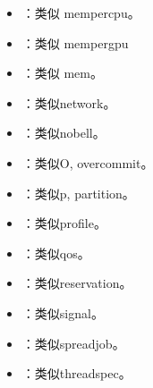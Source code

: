 \documentclass[a4paper,12pt,english]{sphinxmanual}
\begin{document}
\begin{itemize}
\item {} 
\sphinxAtStartPar
{}：类似 \sphinxhyphen{}\sphinxhyphen{}mem\sphinxhyphen{}per\sphinxhyphen{}cpu。

\item {} 
\sphinxAtStartPar
{}：类似 \sphinxhyphen{}\sphinxhyphen{}mem\sphinxhyphen{}per\sphinxhyphen{}gpu

\item {} 
\sphinxAtStartPar
{}：类似 \sphinxhyphen{}\sphinxhyphen{}mem。

\item {} 
\sphinxAtStartPar
{}：类似\sphinxhyphen{}\sphinxhyphen{}network。

\item {} 
\sphinxAtStartPar
{}：类似\sphinxhyphen{}\sphinxhyphen{}no\sphinxhyphen{}bell。

\item {} 
\sphinxAtStartPar
{}：类似\sphinxhyphen{}O, \sphinxhyphen{}\sphinxhyphen{}overcommit。

\item {} 
\sphinxAtStartPar
{}：类似\sphinxhyphen{}p, \sphinxhyphen{}\sphinxhyphen{}partition。

\item {} 
\sphinxAtStartPar
{}：类似\sphinxhyphen{}\sphinxhyphen{}profile。

\item {} 
\sphinxAtStartPar
{}：类似\sphinxhyphen{}\sphinxhyphen{}qos。

\item {} 
\sphinxAtStartPar
{}：类似\sphinxhyphen{}\sphinxhyphen{}reservation。

\item {} 
\sphinxAtStartPar
{}：类似\sphinxhyphen{}\sphinxhyphen{}signal。

\item {} 
\sphinxAtStartPar
{}：类似\sphinxhyphen{}\sphinxhyphen{}spread\sphinxhyphen{}job。

\item {} 
\sphinxAtStartPar
{}：类似\sphinxhyphen{}\sphinxhyphen{}thread\sphinxhyphen{}spec。


\end{itemize}
\end{document}
